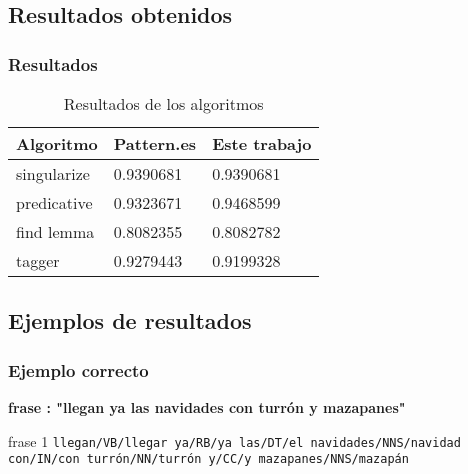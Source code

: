 \documentclass{beamer}
\begin{document}
\subsection{Resultados obtenidos}
\begin{frame}
\frametitle{Resultados}
\begin{table}
\begin{tabular}{l l l}
\toprule
\textbf{Algoritmo} & \textbf{Pattern.es} & \textbf{Este trabajo}\\
\midrule
singularize & 0.9390681  & 0.9390681 \\
predicative & 0.9323671  & 0.9468599 \\
find lemma  & 0.8082355  & 0.8082782 \\
tagger      & 0.9279443  & 0.9199328 \\
\bottomrule
\end{tabular}
\caption{Resultados de los algoritmos}
\end{table}
\end{frame}


\subsection{Ejemplos de resultados}
\begin{frame}
\frametitle{Ejemplo correcto}
\textbf{frase : "llegan ya las navidades con turrón y mazapanes"} \newline

\begin{scriptsize}
\begin{block}{frase 1}
\texttt{llegan/VB/llegar\newline
ya/RB/ya\newline
las/DT/el\newline
navidades/NNS/navidad\newline
con/IN/con\newline
turrón/NN/turrón\newline
y/CC/y\newline
mazapanes/NNS/mazapán\newline
}
\end{block}
\end{scriptsize}
\end{frame}
\end{document}
